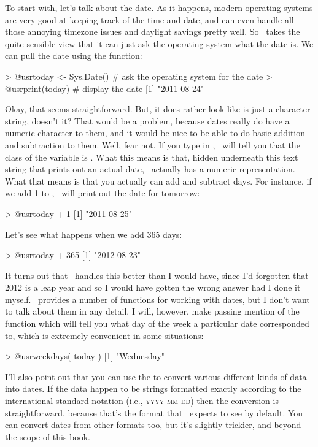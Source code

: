 To start with, let's talk about the date. As it happens, modern operating systems are very good at keeping track of the time and date, and can even handle all those annoying timezone issues and daylight savings pretty well. So \R\ takes the quite sensible view that it can just ask the operating system what the date is. We can pull the date using the  function:
\begin{rblock1}
> @usr{today <- Sys.Date()}  # ask the operating system for the date
> @usr{print(today)}         # display the date
[1] "2011-08-24"
\end{rblock1}
Okay, that seems straightforward. But, it does rather look like  is just a character string, doesn't it? That would be a problem, because dates really do have a numeric character to them, and it would be nice to be able to do basic addition and subtraction to them. Well, fear not. If you type in , \R\ will tell you that the class of the  variable is . What this means is that, hidden underneath this text string that prints out an actual date, \R\ actually has a numeric representation. What that means is that you actually can add and subtract days. For instance, if we add 1 to , \R\ will print out the date for tomorrow:
\begin{rblock1}
> @usr{today + 1}
[1] "2011-08-25"
\end{rblock1}
Let's see what happens when we add 365 days:
\begin{rblock1}
> @usr{today + 365}
[1] "2012-08-23"
\end{rblock1}
It turns out that \R\ handles this better than I would have, since I'd forgotten that 2012 is a leap year and so I would have gotten the wrong answer had I done it myself. \R\ provides a number of functions for working with dates, but I don't want to talk about them in any detail. I will, however, make passing mention of the  function which will tell you what day of the week a particular date corresponded to, which is extremely convenient in some situations:
\begin{rblock1} 
> @usr{weekdays( today )}
[1] "Wednesday"
\end{rblock1}
I'll also point out that you can use the  to convert various different kinds of data into dates. If the data happen to be strings formatted exactly according to the international standard notation (i.e., \textsc{yyyy-mm-dd}) then the conversion is straightforward, because that's the format that \R\ expects to see by default. You can convert dates from other formats too, but it's slightly trickier, and beyond the scope of this book.


